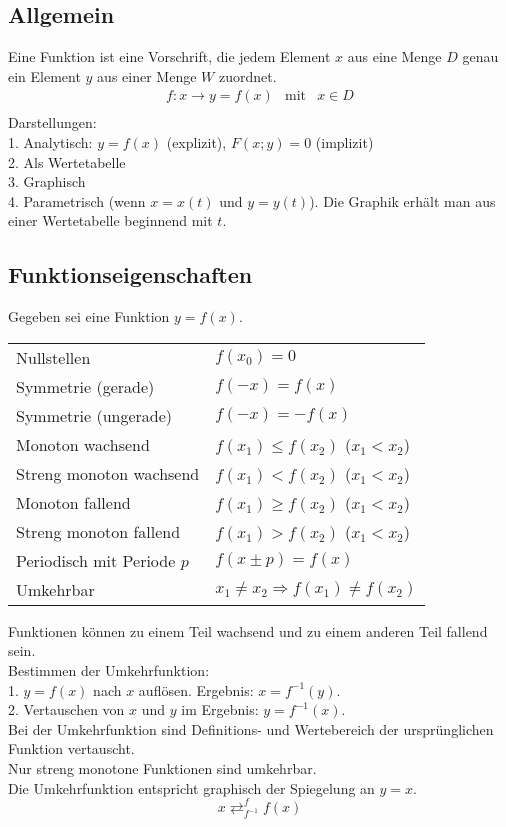 \subsection{Allgemein}
Eine Funktion ist eine Vorschrift, die jedem Element $x$ aus eine Menge $D$ genau ein Element $y$ aus einer Menge $W$ zuordnet.
\begin{equation*}
	\begin{matrix}
	f: x \rightarrow y = f(x) & \mbox{mit} & x \in D\\	
	\end{matrix}	
\end{equation*}
Darstellungen:\\
1. Analytisch: $y = f(x)$ (explizit), $F(x;y) = 0$ (implizit)\\
2. Als Wertetabelle\\
3. Graphisch\\
4. Parametrisch (wenn $x = x(t)$ und $y = y(t)$). Die Graphik erhält man aus einer Wertetabelle beginnend mit $t$.

\subsection{Funktionseigenschaften}
Gegeben sei eine Funktion $y = f(x)$.
\settowidth{\MyLenA}{Streng monoton wachsend~~}
\begin{tabular}{@{}p{\the\MyLenA}%
				@{}p{\linewidth - \the\MyLenA}}
Nullstellen & $f(x_0) = 0$\\
Symmetrie (gerade)	& $f(-x) = f(x)$ \\
Symmetrie (ungerade) & $f(-x) = - f(x)$\\
Monoton wachsend & $f(x_1) \leq f(x_2)$ ($x_1 < x_2$) \\
Streng monoton wachsend & $f(x_1) < f(x_2)$ ($x_1 < x_2$)\\
Monoton fallend & $f(x_1) \geq f(x_2)$ ($x_1 < x_2$) \\
Streng monoton fallend & $f(x_1) > f(x_2)$ ($x_1 < x_2$)\\
Periodisch mit Periode $p$ & $f(x \pm p) = f(x)$\\
Umkehrbar & $x_1 \neq x_2 \Rightarrow f(x_1) \neq f(x_2)$\\
\end{tabular}

Funktionen können zu einem Teil wachsend und zu einem anderen Teil fallend sein.\\
Bestimmen der Umkehrfunktion:\\
1. $y = f(x)$ nach $x$ auflösen. Ergebnis: $x = f^{-1}(y)$.\\
2. Vertauschen von $x$ und $y$ im Ergebnis: $y = f^{-1}(x)$.\\
Bei der Umkehrfunktion sind Definitions- und Wertebereich der ursprünglichen Funktion vertauscht.\\
Nur streng monotone Funktionen sind umkehrbar.\\
Die Umkehrfunktion entspricht graphisch der Spiegelung an $y=x$.
\begin{equation*}
	x\mathop{\rightleftarrows}^{f}_{f^{-1}}f(x)
\end{equation*}


